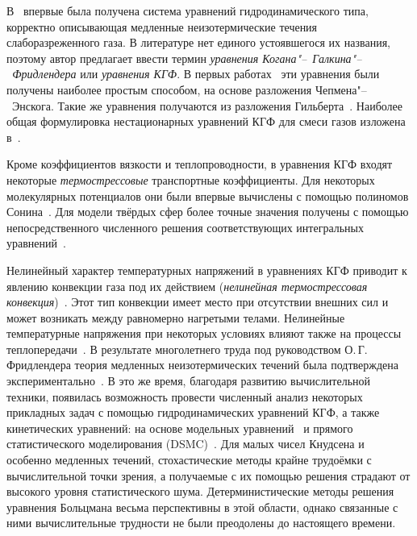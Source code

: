 \documentclass[
aps,%
12pt,%
final,%
notitlepage,%
oneside,%
onecolumn,%
nobibnotes,%
nofootinbib,%
superscriptaddress,%
noshowpacs,%
showkeys,%
centertags]%
{revtex4}
\begin{document}
В~\cite{Kogan1970} впервые была получена система уравнений гидродинамического типа,
корректно описывающая медленные неизотермические течения слаборазреженного газа.
В литературе нет единого устоявшегося их названия,
поэтому автор предлагает ввести термин \emph{уравнения Когана"--~Галкина"--~Фридлендера}
или \emph{уравнения КГФ}.
В первых работах~\cite{Kogan1970, Kogan1971} эти уравнения были получены наиболее простым способом,
на основе разложения Чепмена"--~Энскога. Такие же уравнения получаются из разложения Гильберта~\cite{Galkin1974}.
Наиболее общая формулировка нестационарных уравнений КГФ для смеси газов изложена в~\cite{Galkin2015}.

Кроме коэффициентов вязкости и теплопроводности, в уравнения КГФ входят некоторые
\emph{термострессовые} транспортные коэффициенты. Для некоторых молекулярных потенциалов они
были впервые вычислены с помощью полиномов Сонина~\cite{Burnett1935, Chapman1960}.
Для модели твёрдых сфер более точные значения получены с помощью
непосредственного численного решения соответствующих интегральных уравнений~\cite{Sone1996, Sone2002, Sone2007}.

Нелинейный характер температурных напряжений в уравнениях КГФ приводит к
явлению конвекции газа под их действием (\emph{нелинейная термострессовая конвекция})~\cite{Kogan1971}.
Этот тип конвекции имеет место при отсутствии внешних сил и может возникать между равномерно нагретыми телами.
Нелинейные температурные напряжения при некоторых условиях влияют также на процессы теплопередачи~\cite{Friedlander1978}.
В результате многолетнего труда под руководством О.\,Г. Фридлендера теория медленных неизотермических течений
была подтверждена экспериментально~\cite{Friedlander1997, Friedlander2003}.
В это же время, благодаря развитию вычислительной техники, появилась возможность провести численный анализ
некоторых прикладных задач с помощью гидродинамических уравнений КГФ, а также кинетических уравнений:
на основе модельных уравнений~\cite{Alexandrov2002, Aoki2006, Alexandrov2008b, Alexandrov2011, Rykov2008}
и прямого статистического моделирования (DSMC)~\cite{Alexandrov2008a, Aoki2007}.
Для малых чисел Кнудсена и особенно медленных течений, стохастические методы крайне трудоёмки с вычислительной точки зрения,
а получаемые с их помощью решения страдают от высокого уровня статистического шума.
Детерминистические методы решения уравнения Больцмана весьма перспективны в этой области,
однако связанные с ними вычислительные трудности не были преодолены до настоящего времени.
\end{document}
